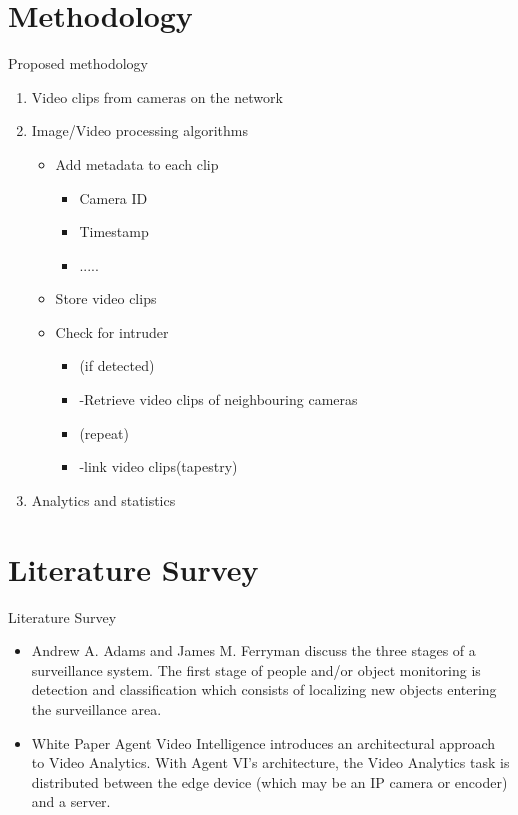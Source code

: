 \documentclass{beamer}
\begin{document}
\section{Methodology}
\begin{frame}{Proposed methodology}
\begin{enumerate}[1.]
\item Video clips from cameras on the network 
\item Image/Video processing algorithms
	  \begin{itemize}
	  \item Add metadata to each clip
      	\begin{itemize}
      	\item Camera ID
      	\item Timestamp
      	\item .....
      	\end{itemize}
	  \item Store video clips
      \item Check for intruder
        \begin{itemize}[ ]
        \item (if detected)
        \item -Retrieve video clips of neighbouring cameras
        \item (repeat)
        \item -link video clips(tapestry)
        \end{itemize}
	  \end{itemize}
\item Analytics and statistics
\end{enumerate}
\end{frame}


\section{Literature Survey} 
\begin{frame}{Literature Survey}
  \begin{itemize}
    \item Andrew A. Adams and James M. Ferryman discuss the three stages of a surveillance system. The first stage of people and/or object monitoring is detection and classification which consists of localizing new objects entering the surveillance area.
    \newline
    \item White Paper Agent Video Intelligence introduces an architectural approach to Video Analytics. With Agent VI’s architecture, the Video Analytics task is distributed between the edge device (which may be an IP camera or encoder) and a server.
   
  \end{itemize}
\end{frame}
\end{document}
